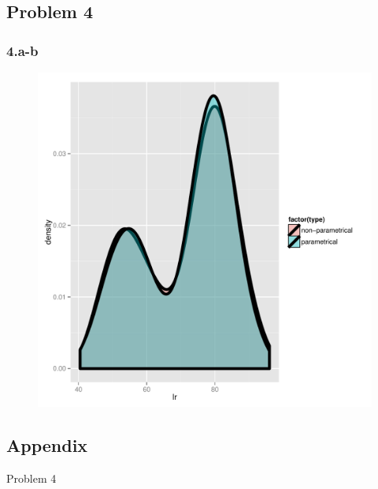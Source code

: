 \documentclass[letter]{article}
\begin{document}
\subsection*{Problem 4}

\subsubsection*{4.a-b}


\begin{figure}[h]
 \includegraphics[scale=0.5]{plot4b.pdf}
\end{figure}
\pagebreak

\subsection*{Appendix}

{Problem 4}

\end{document}
